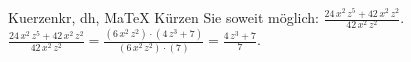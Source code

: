 \begin{MAufgabe}{Kuerzen}{kr, dh, MaTeX}
K\"urzen Sie soweit m\"oglich: $\frac{24\, x^2\, z^5 + 42\, x^2\, z^2}{42\, x^2\, z^2}$.\\ 
\ifLsg\MLoesung
\quad $\frac{24\, x^2\, z^5 + 42\, x^2\, z^2}{42\, x^2\, z^2}=\frac{(6\, x^2\, z^2)\cdot(4\, z^3 + 7)}{(6\, x^2\, z^2)\cdot(7)}=\frac{4\, z^3 + 7}{7}$.\else\relax\fi
 \end{MAufgabe}